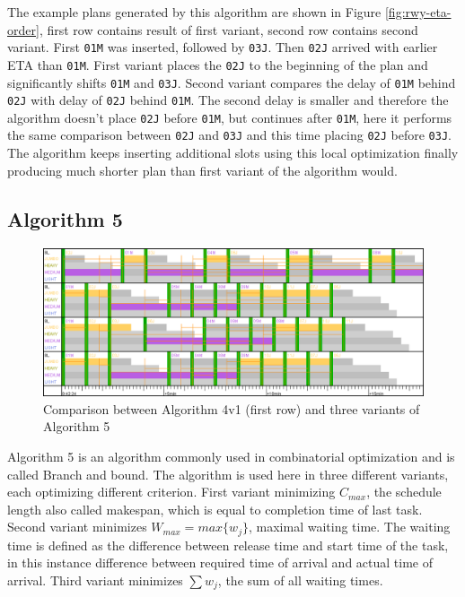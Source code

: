 The example plans generated by this algorithm are shown in Figure \ref{fig:rwy-eta-order}, first row contains result of first variant, second row contains second variant. First \texttt{01M} was inserted, followed by \texttt{03J}. Then \texttt{02J} arrived with earlier ETA than \texttt{01M}. First variant places the \texttt{02J} to the beginning of the plan and significantly shifts \texttt{01M} and \texttt{03J}. Second variant compares the delay of \texttt{01M} behind \texttt{02J} with delay of \texttt{02J} behind \texttt{01M}. The second delay is smaller and therefore the algorithm doesn't place \texttt{02J} before \texttt{01M}, but continues after \texttt{01M}, here it performs the same comparison between \texttt{02J} and \texttt{03J} and this time placing \texttt{02J} before \texttt{03J}. The algorithm keeps inserting additional slots using this local optimization finally producing much shorter plan than first variant of the algorithm would.

\subsection{Algorithm 5}

\begin{figure}[h]
    \centering
    \includegraphics[width=\textwidth]{figures/rwy-bab.png}
    \caption{Comparison between Algorithm 4v1 (first row) and three variants of Algorithm 5}
    \label{fig:rwy-bab}
\end{figure}

Algorithm 5 is an algorithm commonly used in combinatorial optimization and is called Branch and bound. \cite{bab} The algorithm is used here in three different variants, each optimizing different criterion. First variant minimizing $C_{max}$, the schedule length also called makespan, which is equal to completion time of last task.  Second variant minimizes $W_{max} = max\{w_j\}$, maximal waiting time. The waiting time is defined as the difference between release time and start time of the task, in this instance difference between required time of arrival and actual time of arrival. Third variant minimizes $\sum{w_j}$, the sum of all waiting times.

